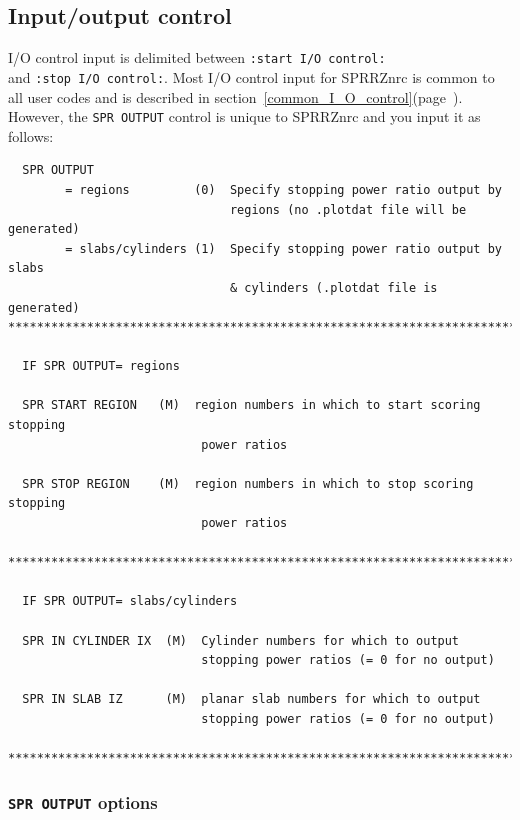 \documentclass[12pt,twoside]{article}  %
\newcommand{\lpage}[1]{(page~\pageref{#1})}
\begin{document}
\subsection{Input/output control}

I/O control input is delimited between \verb+:start I/O control:+\\
and \verb+:stop I/O control:+.  Most I/O control input
for SPRRZnrc is common to all user codes and is described in
section~\ref{common_I_O_control}\lpage{common_I_O_control}.  However,
the {\tt SPR OUTPUT} control is unique to SPRRZnrc and you input it
as follows:
\begin{verbatim}
  SPR OUTPUT
        = regions         (0)  Specify stopping power ratio output by 
                               regions (no .plotdat file will be generated)
        = slabs/cylinders (1)  Specify stopping power ratio output by slabs
                               & cylinders (.plotdat file is generated) 
***************************************************************************

  IF SPR OUTPUT= regions

  SPR START REGION   (M)  region numbers in which to start scoring stopping
                           power ratios

  SPR STOP REGION    (M)  region numbers in which to stop scoring stopping
                           power ratios

***************************************************************************

  IF SPR OUTPUT= slabs/cylinders

  SPR IN CYLINDER IX  (M)  Cylinder numbers for which to output
                           stopping power ratios (= 0 for no output)

  SPR IN SLAB IZ      (M)  planar slab numbers for which to output
                           stopping power ratios (= 0 for no output)

**************************************************************************  
\end{verbatim}

\subsubsection{{\tt SPR OUTPUT} options}
\end{document}
